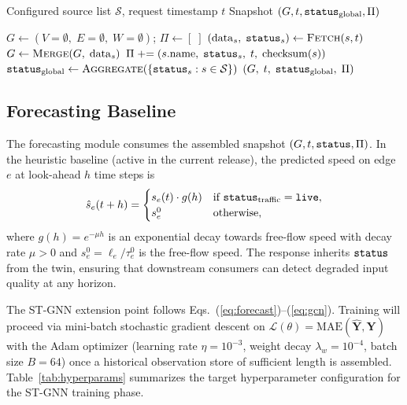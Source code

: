 \begin{algorithm}[t]
\caption{Digital Twin State Assembly}
\label{alg:assembly}
\begin{algorithmic}[1]
\Require Configured source list $\mathcal{S}$, request timestamp $t$
\Ensure Snapshot $(G, t, \mathtt{status}_{\mathrm{global}}, \Pi)$

\State $G \leftarrow (V{=}\emptyset,\; E{=}\emptyset,\; W{=}\emptyset)$;\;
       $\Pi \leftarrow [\;]$
  \State $(\mathrm{data}_s,\; \mathtt{status}_s) \leftarrow \textsc{Fetch}(s, t)$
    \State $G \leftarrow \textsc{Merge}(G,\; \mathrm{data}_s)$
  \EndIf
  \State $\Pi \mathrel{+}= (s.\mathrm{name},\;\mathtt{status}_s,\;t,\;\mathrm{checksum}(s))$
\EndFor
\State $\mathtt{status}_{\mathrm{global}} \leftarrow \textsc{Aggregate}(\{\mathtt{status}_s : s \in \mathcal{S}\})$
\State \Return $(G,\; t,\; \mathtt{status}_{\mathrm{global}},\; \Pi)$
\end{algorithmic}
\end{algorithm}

\subsection{Forecasting Baseline}

The forecasting module consumes the assembled snapshot $(G, t, \mathtt{status}, \Pi)$.
In the heuristic baseline (active in the current release), the predicted
speed on edge $e$ at look-ahead $h$ time steps is
\begin{equation}
  \hat{s}_e(t+h) =
  \begin{cases}
    s_e(t) \cdot g(h) & \text{if } \mathtt{status}_{\mathrm{traffic}} = \texttt{live}, \\
    s_e^0             & \text{otherwise,}
  \end{cases}
  \label{eq:heuristic_forecast}
\end{equation}
where $g(h) = e^{-\mu h}$ is an exponential decay towards free-flow speed
with decay rate $\mu > 0$ and $s_e^0 = \ell_e / \tau_e^0$ is the free-flow
speed.
The response inherits $\mathtt{status}$ from the twin, ensuring that downstream consumers
can detect degraded input quality at any horizon.

The ST-GNN extension point follows Eqs.~(\ref{eq:forecast})--(\ref{eq:gcn}).
Training will proceed via mini-batch stochastic gradient descent on
$\mathcal{L}(\theta) = \mathrm{MAE}(\hat{\mathbf{Y}}, \mathbf{Y})$ with
the Adam optimizer (learning rate $\eta = 10^{-3}$, weight decay
$\lambda_w = 10^{-4}$, batch size $B = 64$) once a historical observation
store of sufficient length is assembled.
Table~\ref{tab:hyperparams} summarizes the target hyperparameter
configuration for the ST-GNN training phase.

